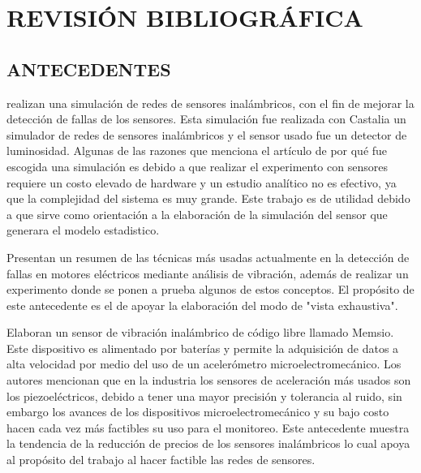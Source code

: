 \thispagestyle{empty}

\section{REVISIÓN BIBLIOGRÁFICA}

\subsection{ANTECEDENTES}

\textcite{Pinto} realizan una simulación de redes de sensores inalámbricos, con
el fin de mejorar la detección de fallas de los sensores. Esta simulación fue
realizada con Castalia un simulador de redes de sensores inalámbricos y el
sensor usado fue un detector de luminosidad. Algunas de las razones que
menciona el artículo de por qué fue escogida una simulación es debido a que
realizar el experimento con sensores requiere un costo elevado de hardware y un
estudio analítico no es efectivo, ya que la complejidad del sistema es muy
grande. Este trabajo es de utilidad debido a que sirve como orientación a la
elaboración de la simulación del sensor que generara el modelo estadistico.

\textcite{Ugwiri} Presentan un resumen de las técnicas más usadas actualmente
en la detección de fallas en motores eléctricos mediante análisis de vibración,
además de realizar un experimento donde se ponen a prueba algunos de estos
conceptos. El propósito de este antecedente es el de apoyar la elaboración del
modo de "vista exhaustiva".

\textcite{Koene} Elaboran un sensor de vibración inalámbrico de código libre
llamado Memsio. Este dispositivo es alimentado por baterías y permite la
adquisición de datos a alta velocidad por medio del uso de un acelerómetro
microelectromecánico. Los autores mencionan que en la industria los sensores de
aceleración más usados son los piezoeléctricos, debido a tener una mayor
precisión y tolerancia al ruido, sin embargo los avances de los dispositivos
microelectromecánico y su bajo costo hacen cada vez más factibles su uso para
el monitoreo. Este antecedente muestra la tendencia de la reducción de precios
de los sensores inalámbricos lo cual apoya al propósito del trabajo al hacer
factible las redes de sensores.

